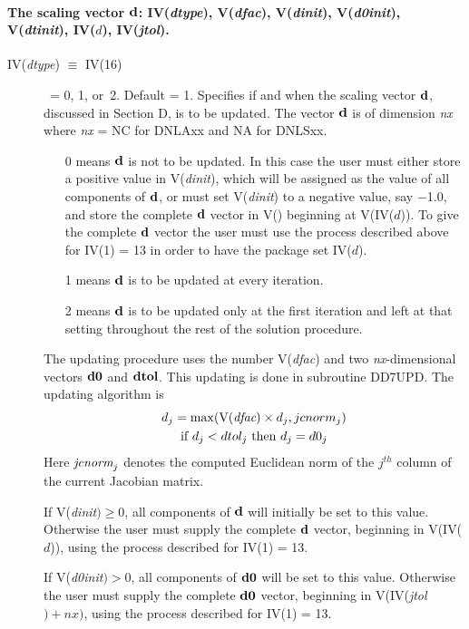 \documentclass[twoside]{MATH77}
\begin{document}
\paragraph{The scaling vector ${\bf d}$: IV({\em dtype}), V({\em dfac}),
V({\em dinit}), V({\em d0init}), V({\em dtinit}), IV($d$), IV({\em jtol}).}
\begin{description}
\item[IV({\em dtype}) $\equiv $ IV(16)]  \ \label{dtype}= 0, 1, or~2. Default = 1.
Specifies if and when the scaling vector ${\bf d}$, discussed in Section D, is
to be updated. The vector ${\bf d}$ is of dimension {\em nx} where {\em nx} =
NC for DNLAxx and NA for DNLSxx.
\begin{itemize}
\item[0] means ${\bf d}$ is not to be updated. In this case the user must
either store a positive value in V({\em dinit}), which will be assigned as the
value of all components of ${\bf d}$, or must set V({\em dinit}) to a negative
value, say $-$1.0, and store the complete ${\bf d}$ vector in V() beginning
at V(IV($d$)). To give the complete ${\bf d}$ vector the user must use the
process described above for IV(1) = 13 in order to have the package set IV($d$).

\item[1] means ${\bf d}$ is to be updated at every iteration.

\item[2] means ${\bf d}$ is to be updated only at the first iteration and left at
that setting throughout the rest of the solution procedure.
\end{itemize}
The updating procedure uses the number V({\em dfac}) and two {\em nx}-dimensional
vectors ${\bf d0}$ and ${\bf dtol}$. This updating is done in subroutine DD7UPD. The
updating algorithm is
\begin{gather*}
d_j=\max (\text{V({\em dfac})}\times d_j, jcnorm_j)\\
\text{if }d_j<dtol_j\text{ then }d_j=d0_j
\end{gather*}
Here $\text{\em jcnorm}_j$ denotes the computed Euclidean norm of the $j^{th}$ column
of the current Jacobian matrix.

If V({\em dinit}$)\geq 0$, all components of ${\bf d}$ will initially be set to this
value. Otherwise the user must supply the complete ${\bf d}$ vector, beginning in
V(IV($d$)), using the process described for IV(1) = 13.

If V({\em d0init}$)>0$, all components of ${\bf d0}$ will be set to this value. Otherwise
the user must supply the complete ${\bf d0}$ vector, beginning in V(IV({\em jtol}$)+nx)$,
using the process described for IV(1) = 13.


\end{description}
\end{document}

